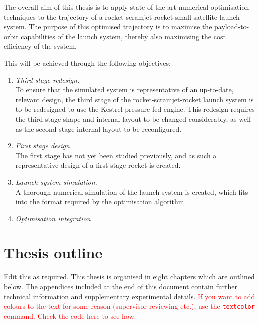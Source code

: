     The overall aim of this thesis is to apply state of the art numerical optimisation techniques to the trajectory of a rocket-scramjet-rocket small satellite launch system. The purpose of this optimised trajectory is to maximise the payload-to-orbit capabilities of the launch system, thereby also maximising the cost efficiency of the system. 
    

    \noindent This will be achieved through the following objectives:

    \begin{enumerate}
    	 \item \emph{Third stage redesign.}\\
    	 To ensure that the simulated system is representative of an up-to-date, relevant design,
    	 the third stage of the rocket-scramjet-rocket launch system is to be redesigned to use the Kestrel pressure-fed engine. This redesign requires the third stage  shape and internal layout to be changed considerably, as well as the second stage internal layout to be reconfigured. 

\item \emph{First stage design.}\\
		The first stage has not yet been studied previously, and as such a representative design of a first stage rocket is created. 
    	
      \item \emph{Launch system simulation.}\\
      A thorough numerical simulation of the launch system is created, which fits into the format required by the optimisation algorithm. 

      \item \emph{Optimisation integration}\\



    \end{enumerate}

  \clearpage
  \section{Thesis outline}

    Edit this as required. This thesis is organised in eight chapters which are outlined below. The appendices included at the end of this document contain further technical information and supplementary experimental details. \textcolor{red}{If you want to add colours to the text for some reason (supervisor reviewing etc.), use the \texttt{textcolor} command. Check the code here to see how.}

